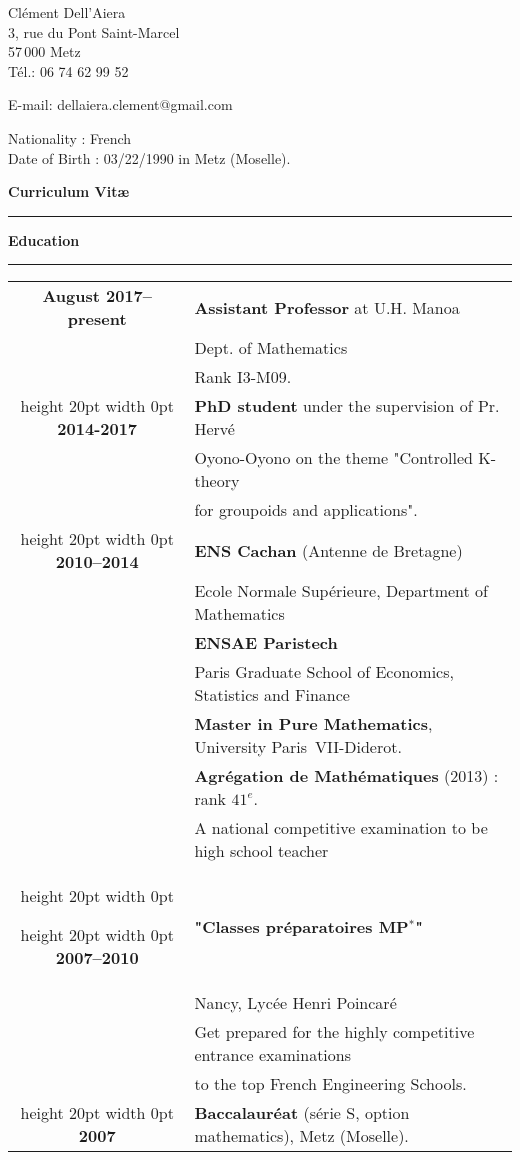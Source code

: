 \documentclass[a4paper,11pt]{article}
\newcommand\espace{\vrule height 20pt width 0pt}
\newcommand{\titre}[1]{%
	\begin{center}
	\bigskip
	\rule{\textwidth}{1pt}
	\par\vspace{0.1cm}
        \textbf{\large #1}
	\par\rule{\textwidth}{1pt}
	\end{center}
	\bigskip
	}
\begin{document}
\begin{flushleft}
Clément Dell'Aiera \\
3, rue du Pont Saint-Marcel\\
57\,000 Metz \\

\medskip
Tél.: 06 74 62 99 52

E-mail: dellaiera.clement@gmail.com


\end{flushleft}
\begin{flushleft}
Nationality : French \\
Date of Birth : 03/22/1990 in Metz (Moselle).
\end{flushleft}

\vspace{1.5cm}
\begin{center}
\par\huge{\textbf{Curriculum Vit\ae} }
\end{center}

\titre{Education}

\begin{tabular}{cp{}}

\textbf{August 2017--present} &  \textbf{Assistant Professor} at U.H. Manoa  \\
						& Dept. of Mathematics\\
						& Rank I3-M09. \\
\espace
\textbf{2014-2017} &  \textbf{PhD student} under the supervision of Pr. Hervé  \\
						& Oyono-Oyono on the theme "Controlled K-theory \\
						& for groupoids and applications". \\
\espace
\textbf{2010--2014} &  \textbf{ENS Cachan} (Antenne de Bretagne) \\
				    & 	Ecole Normale Supérieure, Department of Mathematics \\
                              & \textbf{ENSAE Paristech}\\
				&	Paris Graduate School of Economics, Statistics and Finance\\
                                   & \textbf{Master in Pure Mathematics}, University Paris~VII-Diderot. \\
                                   & \textbf{Agrégation de Mathématiques} (2013) : rank $41^e$. \\
				& A national competitive examination to be high school teacher\\
\espace

\espace
\textbf{2007--2010} &\textbf{ "Classes préparatoires MP$^*$" } \\
					& Nancy, Lycée Henri Poincaré\\
					& Get prepared for the highly competitive entrance examinations\\
				& to the top French Engineering Schools.\\

\espace
\textbf{2007} & \textbf{Baccalauréat} (série S, option mathematics), Metz (Moselle). 
 \\

\end{tabular}
\end{document}
